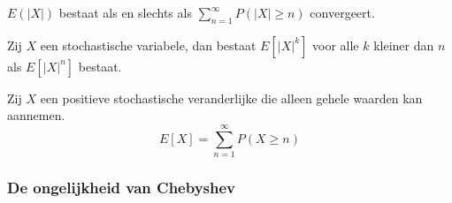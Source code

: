 \documentclass[main.tex]{subfiles}
\begin{document}
\begin{gev}
  $E(|X|)$ bestaat als en slechts als $\sum_{n=1}^{\infty}P(|X| \ge n)$ convergeert.
\end{gev}

\begin{st}
  Zij $X$ een stochastische variabele, dan bestaat $E[|X|^{k}]$ voor alle $k$ kleiner dan $n$ als $E[|X|^{n}]$ bestaat.
\end{st}

\begin{gev}
  Zij $X$ een positieve stochastische veranderlijke die alleen gehele waarden kan aannemen.
  \[ E[X] = \sum_{n=1}^{\infty}P(X\ge n) \]
\end{gev}

\subsubsection{De ongelijkheid van Chebyshev}
\label{sec:de-ongelijkheid-van}
\end{document}
